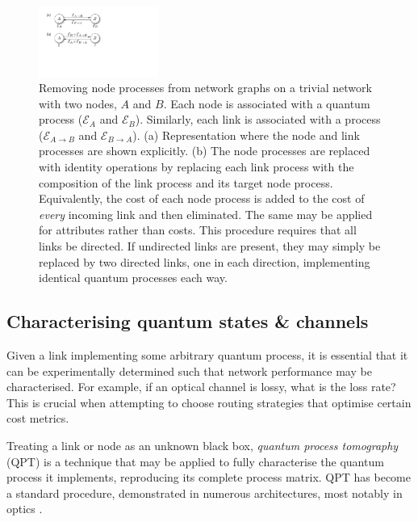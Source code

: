 \begin{figure}[!htbp]
\includegraphics[clip=true, width=0.35\textwidth]{remove_nodes}
\captionspacefig \caption{Removing node processes from network graphs on a trivial network with two nodes, $A$ and $B$. Each node is associated with a quantum process ($\mathcal{E}_A$ and $\mathcal{E}_B$). Similarly, each link is associated with a process ($\mathcal{E}_{A\to B}$ and $\mathcal{E}_{B\to A}$). (a) Representation where the node and link processes are shown explicitly. (b) The node processes are replaced with identity operations by replacing each link process with the composition of the link process and its target node process. Equivalently, the cost of each node process is added to the cost of \textit{every} incoming link and then eliminated. The same may be applied for attributes rather than costs. This procedure requires that all links be directed. If undirected links are present, they may simply be replaced by two directed links, one in each direction, implementing identical quantum processes each way.} \label{fig:remove_nodes}
\end{figure}

%
%

\subsection{Characterising quantum states \& channels} \label{sec:QPT}

Given a link implementing some arbitrary quantum process, it is essential that it can be experimentally determined such that network performance may be characterised. For example, if an optical channel is lossy, what is the loss rate? This is crucial when attempting to choose routing strategies that optimise certain cost metrics.

Treating a link or node as an unknown black box, \textit{quantum process tomography} (QPT) \cite{bib:ChuangNielsen97} is a technique that may be applied to fully characterise the quantum process it implements, reproducing its complete process matrix. QPT has become a standard procedure, demonstrated in numerous architectures, most notably in optics \cite{bib:OBrien04, bib:RohdeGateChar05}.

